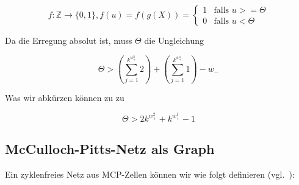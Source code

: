 \begin{equation}
f:  \mathbb{Z} \to \{0, 1\}, f(u) = f(g(X)) = \begin{cases}
                                          1  &\text{falls } u >= \Theta \\
                                          0 &\text{falls } u < \Theta
\end{cases}
\label{eq:gl-activation}
\end{equation}\linebreak[2]


\noindent
Da die Erregung absolut ist, muss $\Theta$ die Ungleichung

\begin{equation}
\Theta > (\sum^{k^{w_+^2}}_{j=1} 2) + (\sum^{k^{w_+^1}}_{j=1} 1) - w_-
\end{equation}\linebreak[2]



\noindent
Was wir abkürzen können zu zu

\begin{equation}
\Theta > 2k^{w_+^2} + k^{w_+^1} - 1
\end{equation}


\subsection{McCulloch-Pitts-Netz als Graph}

Ein zyklenfreies Netz aus MCP-Zellen können wir wie folgt definieren (vgl.~\cite[32 ``Definition 2.1``]{Roj93}):


